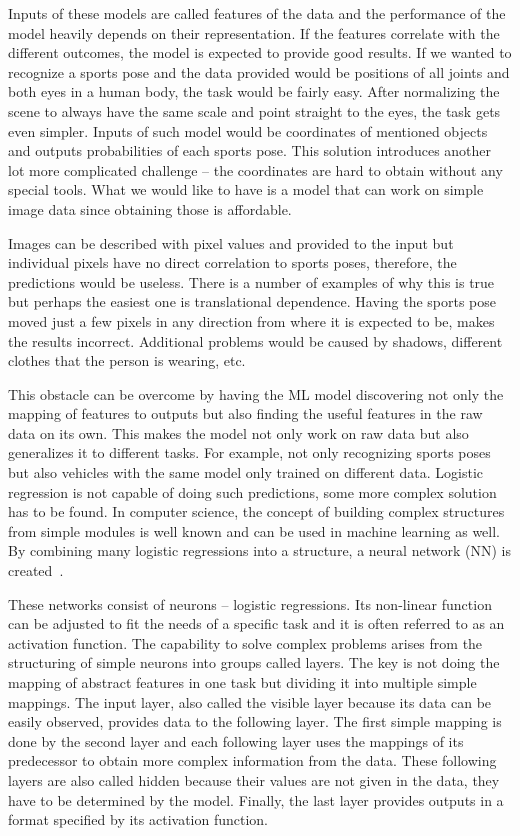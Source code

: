 Inputs of these models are called features of the data and the performance of the model heavily depends on their representation. If the features correlate with the different outcomes, the model is expected to provide good results. If we wanted to recognize a sports pose and the data provided would be positions of all joints and both eyes in a human body, the task would be fairly easy. After normalizing the scene to always have the same scale and point straight to the eyes, the task gets even simpler. Inputs of such model would be coordinates of mentioned objects and outputs probabilities of each sports pose. This solution introduces another lot more complicated challenge -- the coordinates are hard to obtain without any special tools. What we would like to have is a model that can work on simple image data since obtaining those is affordable.

Images can be described with pixel values and provided to the input but individual pixels have no direct correlation to sports poses, therefore, the predictions would be useless. There is a number of examples of why this is true but perhaps the easiest one is translational dependence. Having the sports pose moved just a few pixels in any direction from where it is expected to be, makes the results incorrect. Additional problems would be caused by shadows, different clothes that the person is wearing, etc.

This obstacle can be overcome by having the ML model discovering not only the mapping of features to outputs but also finding the useful features in the raw data on its own. This makes the model not only work on raw data but also generalizes it to different tasks. For example, not only recognizing sports poses but also vehicles with the same model only trained on different data. Logistic regression is not capable of doing such predictions, some more complex solution has to be found. In computer science, the concept of building complex structures from simple modules is well known and can be used in machine learning as well. By combining many logistic regressions into a structure, a neural network (NN) is created~\cite{Goodfellow-et-al-2016}.

These networks consist of neurons -- logistic regressions. Its non-linear function can be adjusted to fit the needs of a specific task and it is often referred to as an activation function. The capability to solve complex problems arises from the structuring of simple neurons into groups called layers. The key is not doing the mapping of abstract features in one task but dividing it into multiple simple mappings. The input layer, also called the visible layer because its data can be easily observed, provides data to the following layer. The first simple mapping is done by the second layer and each following layer uses the mappings of its predecessor to obtain more complex information from the data. These following layers are also called hidden because their values are not given in the data, they have to be determined by the model. Finally, the last layer provides outputs in a format specified by its activation function.

